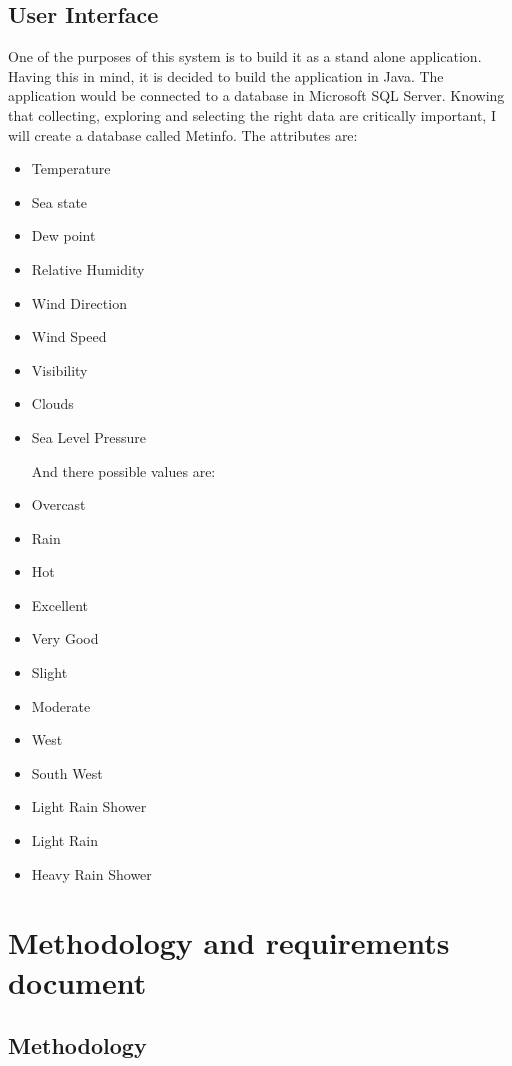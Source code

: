 \documentclass{article}
\begin{document}
\subsection{User Interface}
One of the purposes of this system is to build it as a stand alone application. Having this in mind, it is decided to build the application in Java. The application would be connected to a database in Microsoft SQL Server. Knowing that collecting, exploring and selecting the right data are critically important, I will create a database called Metinfo.
The attributes are:

\begin{itemize}
\item Temperature 
\item Sea state
\item Dew point
\item Relative Humidity
\item Wind Direction
\item Wind Speed
\item Visibility
\item Clouds 
\item Sea Level Pressure

And there possible values are: 

\item Overcast
\item Rain
\item Hot
\item Excellent
\item Very Good
\item Slight
\item Moderate
\item West
\item South West
\item Light Rain Shower
\item Light Rain
\item Heavy Rain Shower


\end{itemize}
\pagebreak

\section{Methodology and requirements document}
\label{sec:methrecdoc}

\subsection{Methodology}
\label{sec:meth}
\end{document}
